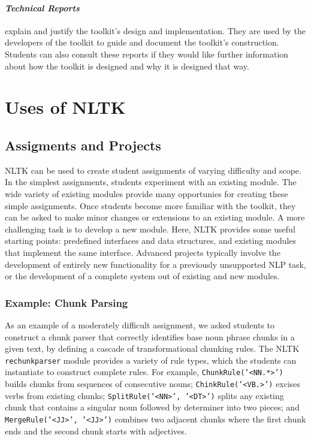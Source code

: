 \documentclass[11pt]{article}
\begin{document}
\paragraph{\textit{Technical Reports}} explain and justify the
toolkit's design and implementation.  They are used by the developers
of the toolkit to guide and document the toolkit's construction.
Students can also consult these reports if they would like further
information about how the toolkit is designed and why it is designed
that way.

\section{Uses of NLTK}
\label{sec:uses}

\subsection{Assigments and Projects}

NLTK can be used to create student assignments of varying difficulty
and scope.  
In the simplest assignments, students experiment with an existing
module.  The wide variety of existing modules provide many opportunies
for creating these simple assignments.
Once students become more familiar with the toolkit, they can be asked
to make minor changes or extensions to an existing module.
A more challenging task is to develop a new module.  Here, NLTK
provides some useful starting points: predefined interfaces and data
structures, and existing modules that implement the same interface.
Advanced projects typically involve the development of entirely new
functionality for a previously unsupported NLP task, or the
development of a complete system out of existing and new modules.

\subsubsection*{Example: Chunk Parsing}

As an example of a moderately difficult assignment, we asked students
to construct a chunk parser that correctly identifies base noun phrase
chunks in a given text, by defining a cascade of transformational
chunking rules.  The NLTK \texttt{rechunkparser} module provides a
variety of rule types, which the students can instantiate to construct
complete rules.  For example, \texttt{ChunkRule('<NN.*>')} builds
chunks from sequences of consecutive nouns; \texttt{ChinkRule('<VB.>')}
excises verbs from existing chunks; \texttt{SplitRule('<NN>', '<DT>')}
splits any existing chunk that contains a singular noun followed by
determiner into two pieces; and \texttt{MergeRule('<JJ>', '<JJ>')}
combines two adjacent chunks where the first chunk ends and the second
chunk starts with adjectives.
\end{document}

